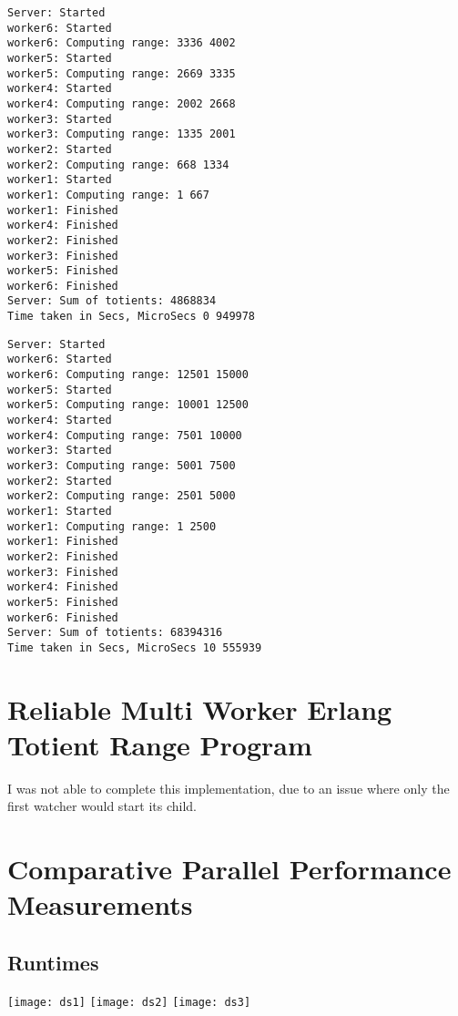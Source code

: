 \documentclass[11pt,a4paper,titlepage]{article}
\begin{document}
\begin{verbatim}
Server: Started
worker6: Started
worker6: Computing range: 3336 4002
worker5: Started
worker5: Computing range: 2669 3335
worker4: Started
worker4: Computing range: 2002 2668
worker3: Started
worker3: Computing range: 1335 2001
worker2: Started
worker2: Computing range: 668 1334
worker1: Started
worker1: Computing range: 1 667
worker1: Finished
worker4: Finished
worker2: Finished
worker3: Finished
worker5: Finished
worker6: Finished
Server: Sum of totients: 4868834
Time taken in Secs, MicroSecs 0 949978
\end{verbatim}

\begin{verbatim}
Server: Started
worker6: Started
worker6: Computing range: 12501 15000
worker5: Started
worker5: Computing range: 10001 12500
worker4: Started
worker4: Computing range: 7501 10000
worker3: Started
worker3: Computing range: 5001 7500
worker2: Started
worker2: Computing range: 2501 5000
worker1: Started
worker1: Computing range: 1 2500
worker1: Finished
worker2: Finished
worker3: Finished
worker4: Finished
worker5: Finished
worker6: Finished
Server: Sum of totients: 68394316
Time taken in Secs, MicroSecs 10 555939
\end{verbatim}

\section{Reliable Multi Worker Erlang Totient Range Program}
I was not able to complete this implementation, due to an issue where only the first watcher would start its child.

\section{Comparative Parallel Performance Measurements}
\subsection{Runtimes}

\texttt{[image: ds1]}
\texttt{[image: ds2]}
\texttt{[image: ds3]}
\end{document}
